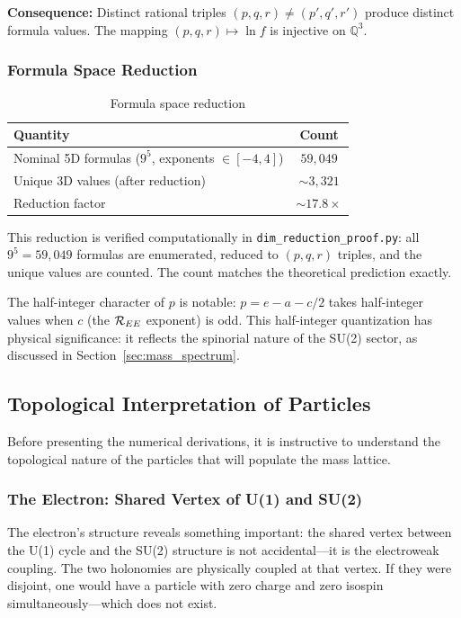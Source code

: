 \textbf{Consequence:} Distinct rational triples $(p, q, r) \neq (p', q', r')$ produce distinct formula values. The mapping $(p, q, r) \mapsto \ln f$ is injective on $\mathbb{Q}^3$.

\subsubsection{Formula Space Reduction}

\begin{table}[h]
\centering
\caption{Formula space reduction}
\begin{tabular}{lc}
\hline\hline
Quantity & Count \\
\hline
Nominal 5D formulas ($9^5$, exponents $\in [-4, 4]$) & $59{,}049$ \\
Unique 3D values (after reduction) & $\sim 3{,}321$ \\
Reduction factor & $\sim 17.8\times$ \\
\hline\hline
\end{tabular}
\end{table}

This reduction is verified computationally in \texttt{dim\_reduction\_proof.py}: all $9^5 = 59{,}049$ formulas are enumerated, reduced to $(p, q, r)$ triples, and the unique values are counted. The count matches the theoretical prediction exactly.

The half-integer character of $p$ is notable: $p = e - a - c/2$ takes half-integer values when $c$ (the $\mathcal{R}_{EE}$ exponent) is odd. This half-integer quantization has physical significance: it reflects the spinorial nature of the SU(2) sector, as discussed in Section~\ref{sec:mass_spectrum}.

\subsection{Topological Interpretation of Particles}\label{sec:particle_topology}

Before presenting the numerical derivations, it is instructive to understand the topological nature of the particles that will populate the mass lattice.

\subsubsection{The Electron: Shared Vertex of U(1) and SU(2)}

The electron's structure reveals something important: the shared vertex between the U(1) cycle and the SU(2) structure is not accidental---it is the electroweak coupling. The two holonomies are physically coupled at that vertex. If they were disjoint, one would have a particle with zero charge and zero isospin simultaneously---which does not exist.

